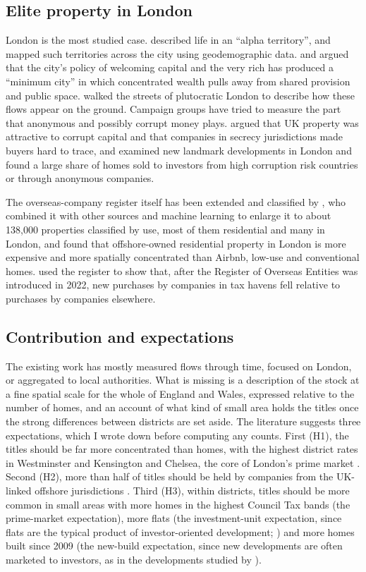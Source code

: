 \documentclass[11pt,a4paper]{article}
\begin{document}
\subsection{Elite property in London}
London is the most studied case. \citet{webber2016} described life in an ``alpha territory'', and \citet{burrows2017} mapped such territories across the city using geodemographic data. \citet{atkinson2017} and \citet{atkinson2020} argued that the city's policy of welcoming capital and the very rich has produced a ``minimum city'' in which concentrated wealth pulls away from shared provision and public space. \citet{knowles2022} walked the streets of plutocratic London to describe how these flows appear on the ground. Campaign groups have tried to measure the part that anonymous and possibly corrupt money plays. \citet{tiuk2015} argued that UK property was attractive to corrupt capital and that companies in secrecy jurisdictions made buyers hard to trace, and \citet{tiuk2017} examined new landmark developments in London and found a large share of homes sold to investors from high corruption risk countries or through anonymous companies.

The overseas-company register itself has been extended and classified by \citet{bourne2022}, who combined it with other sources and machine learning to enlarge it to about 138,000 properties classified by use, most of them residential and many in London, and found that offshore-owned residential property in London is more expensive and more spatially concentrated than Airbnb, low-use and conventional homes. \citet{collin2025} used the register to show that, after the Register of Overseas Entities was introduced in 2022, new purchases by companies in tax havens fell relative to purchases by companies elsewhere.

\subsection{Contribution and expectations}
The existing work has mostly measured flows through time, focused on London, or aggregated to local authorities. What is missing is a description of the stock at a fine spatial scale for the whole of England and Wales, expressed relative to the number of homes, and an account of what kind of small area holds the titles once the strong differences between districts are set aside. The literature suggests three expectations, which I wrote down before computing any counts. First (H1), the titles should be far more concentrated than homes, with the highest district rates in Westminster and Kensington and Chelsea, the core of London's prime market \citep{fernandez2016,burrows2017}. Second (H2), more than half of titles should be held by companies from the UK-linked offshore jurisdictions \citep{haberly2015a,bomare2022}. Third (H3), within districts, titles should be more common in small areas with more homes in the highest Council Tax bands (the prime-market expectation), more flats (the investment-unit expectation, since flats are the typical product of investor-oriented development; \citealp{tiuk2017}) and more homes built since 2009 (the new-build expectation, since new developments are often marketed to investors, as in the developments studied by \citealp{tiuk2017}).
\end{document}
